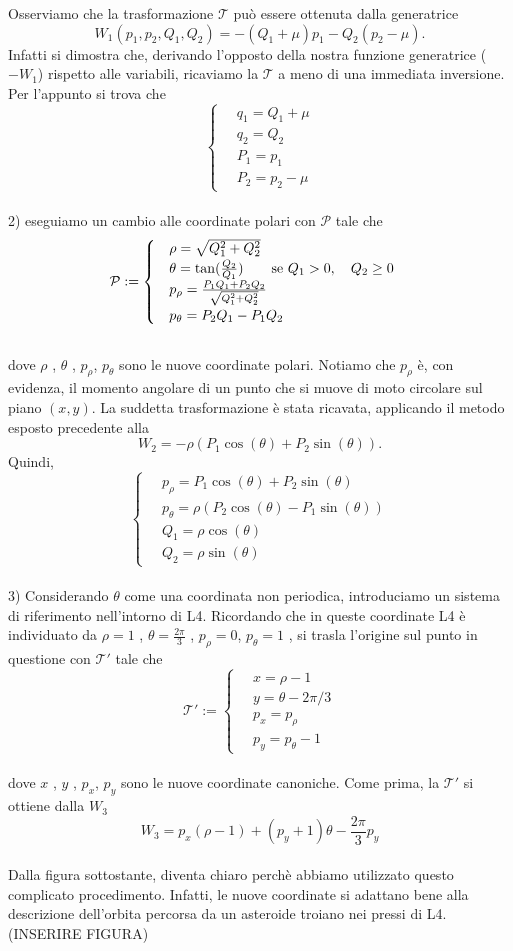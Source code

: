 \documentclass[a4paper,11pt,titlepage]{report}
\theoremstyle{definition}
\theoremstyle{plain}
\begin{document}
Osserviamo che la trasformazione $\mathcal{T}$ può essere ottenuta dalla generatrice $$ W_1(p_1, p_2, Q_1, Q_2) = -(Q_1+ \mu)p_1 - Q_2(p_2- \mu). $$
Infatti si dimostra che, derivando l'opposto della nostra funzione generatrice ($-W_1 $) rispetto alle variabili, ricaviamo la $\mathcal{T}$ a meno di una immediata inversione.     
Per l'appunto si trova che 
$$\begin{cases}
\quad q_1 = Q_1 + \mu    \\
\quad q_2 = Q_2 \\
\quad P_1 = p_1  \\
\quad P_2 = p_2 -\mu 
\end{cases} $$
\\2) eseguiamo un cambio alle coordinate polari con $\mathcal{P}$ tale che
$$ \mathcal{P} :=\begin{cases}
\quad \rho= \sqrt{Q_1^2 + Q_2^2}    \\
\quad \theta= \tan(\frac{Q_2}{Q_1}) \qquad \hbox{se } Q_1 > 0,\quad Q_2 \geq 0\\
\quad p_{\rho} = \frac{P_1Q_1+P_2Q_2}{\sqrt{Q_1^2 + Q_2^2}}\\
\quad p_{\theta} = P_2Q_1-P_1Q_2
\end{cases} $$ 
\\dove $ \rho $ , $ \theta $ , $ p_\rho $, $ p_\theta $ sono le nuove coordinate polari. Notiamo che $p_{\rho}$ è, con evidenza, il momento angolare di un punto che si muove di moto circolare sul piano $(x,y)$.
La suddetta trasformazione è stata ricavata, applicando il metodo esposto precedente alla $$ W_2 = -\rho(P_1 \cos(\theta) + P_2\sin(\theta) ). $$
Quindi, $$\begin{cases}
	\quad p_\rho= P_1\cos(\theta)+P_2\sin(\theta)    \\
	\quad p_\theta= \rho(P_2 \cos(\theta)-P_1\sin(\theta))\\
	\quad Q_1 = \rho \cos(\theta)  \\
	\quad Q_2 = \rho \sin(\theta)
\end{cases} $$
\\3) Considerando $ \theta $ come una coordinata non periodica, introduciamo un sistema di riferimento nell'intorno di L4. Ricordando che in queste coordinate L4 è individuato da $ \rho = 1 $ , $ \theta = \frac{2\pi}{3} $ , $ p_\rho = 0 $, $ p_\theta = 1 $ , si trasla l'origine sul punto in questione con $\mathcal{T'}$ tale che $$\mathcal{T'} := 
\begin{cases}
\quad x = \rho -1\\
\quad y =\theta -2\pi/3  \\
\quad p_x =p_{\rho}  \\
\quad p_y = p_{\theta}-1 
\end{cases} 
$$
\\dove $ x $ , $ y $ , $ p_x $, $ p_y $ sono le nuove coordinate canoniche.
Come prima, la $\mathcal{T'}$ si ottiene dalla $W_3$  $$ W_3 = p_x(\rho - 1) + (p_y+1)\theta - \frac{2\pi}{3} p_y $$ 
\\Dalla figura sottostante, diventa chiaro perchè abbiamo utilizzato questo complicato procedimento. Infatti, le nuove coordinate si adattano bene alla descrizione dell'orbita percorsa da un asteroide troiano nei pressi di L4.
(INSERIRE FIGURA)
\end{document}
